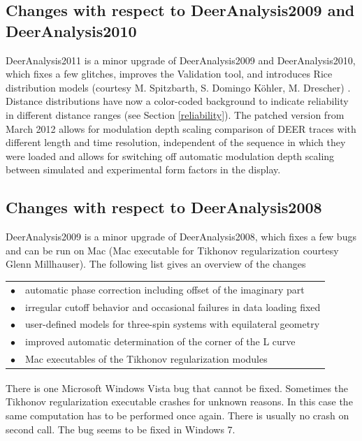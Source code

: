 \documentclass{article}
\begin{document}
\subsection{Changes with respect to DeerAnalysis2009 and DeerAnalysis2010}
\label{changes_2010_1}

DeerAnalysis2011 is a minor upgrade of DeerAnalysis2009 and DeerAnalysis2010, which fixes a few glitches, improves the {\ttfamily Validation} tool, and introduces Rice distribution models (courtesy M. Spitzbarth, S. Domingo K\"ohler, M. Drescher) \cite{koehler2011}. Distance distributions have now a color-coded background to indicate reliability in different distance ranges (see Section \ref{reliability}). The patched version from March 2012 allows for modulation depth scaling comparison of DEER traces with different length and time resolution, independent of the sequence in which they were loaded and allows for switching off automatic modulation depth scaling between simulated and experimental form factors in the display.    

\subsection{Changes with respect to DeerAnalysis2008}
\label{changes_2008_1}

DeerAnalysis2009 is a minor upgrade of DeerAnalysis2008, which fixes a few bugs and can be run on Mac (Mac executable for Tikhonov regularization courtesy Glenn Millhauser). The following list gives an overview of the changes    

\begin{tabular}{ll}
\noalign{\smallskip}
$\bullet$ & automatic phase correction including offset of the imaginary part\\
$\bullet$ & irregular cutoff behavior and occasional failures in data loading fixed\\
$\bullet$ & user-defined models for three-spin systems with equilateral geometry\\
$\bullet$ & improved automatic determination of the corner of the L curve\\
$\bullet$ & Mac executables of the Tikhonov regularization modules\\ 
\end{tabular}

\vspace{10pt}

There is one Microsoft Windows Vista\textsuperscript{\textregistered} bug that cannot be fixed. Sometimes the Tikhonov regularization executable crashes for unknown reasons. In this case the same computation has to be performed once again. There is usually no crash on second call. The bug seems to be fixed in Windows 7.
\end{document}
